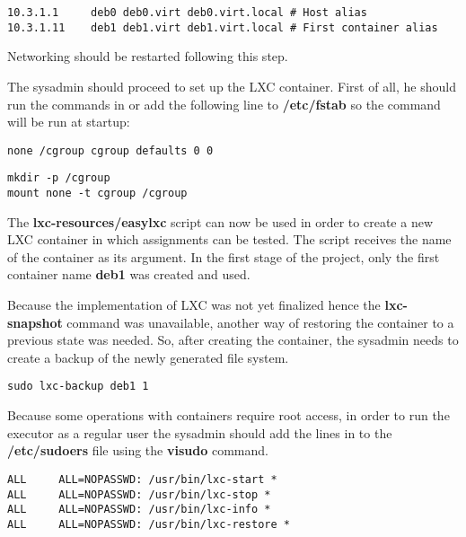\lstset{caption=Host Aliases,label=lst:etc-hosts}
\begin{lstlisting}
10.3.1.1     deb0 deb0.virt deb0.virt.local # Host alias
10.3.1.11    deb1 deb1.virt deb1.virt.local # First container alias
\end{lstlisting}

Networking should be restarted following this step.

The sysadmin should proceed to set up the LXC container. First of all, he should 
run the commands in  or add the 
following line to \textbf{/etc/fstab} so the command will be run at startup:
\lstset{caption=Permanent mounting of cgroup,label=lst:etc-fstab}
\begin{lstlisting}
none /cgroup cgroup defaults 0 0
\end{lstlisting}

\lstset{caption=Manually Mounting cgroup,label=lst:create-cgroup}
\begin{lstlisting}
mkdir -p /cgroup
mount none -t cgroup /cgroup
\end{lstlisting}

The \textbf{lxc-resources/easylxc} script can now be used in order to create
a new LXC container in which assignments can be tested. The script receives the
name of the container as its argument. In the first stage of the project, only the
first container name \textbf{deb1} was created and used.

Because the implementation of LXC was not yet finalized hence the \textbf{lxc-snapshot}
command was unavailable, another way of restoring the container to a previous state
was needed. So, after creating the container, the sysadmin needs to create a backup
of the newly generated file system.

\lstset{caption=Creating a Backup for the File System,label=lst:create-backup}
\begin{lstlisting}
sudo lxc-backup deb1 1
\end{lstlisting}

Because some operations with containers require root access, in order to
run the executor as a regular user the sysadmin should add the lines in 
 to the \textbf{/etc/sudoers} file 
using the \textbf{visudo} command.

\lstset{caption=Uninteractive Sudo Permission,label=lst:etc-sudoers}
\begin{lstlisting}
ALL     ALL=NOPASSWD: /usr/bin/lxc-start *
ALL     ALL=NOPASSWD: /usr/bin/lxc-stop *
ALL     ALL=NOPASSWD: /usr/bin/lxc-info *
ALL     ALL=NOPASSWD: /usr/bin/lxc-restore *
\end{lstlisting}


